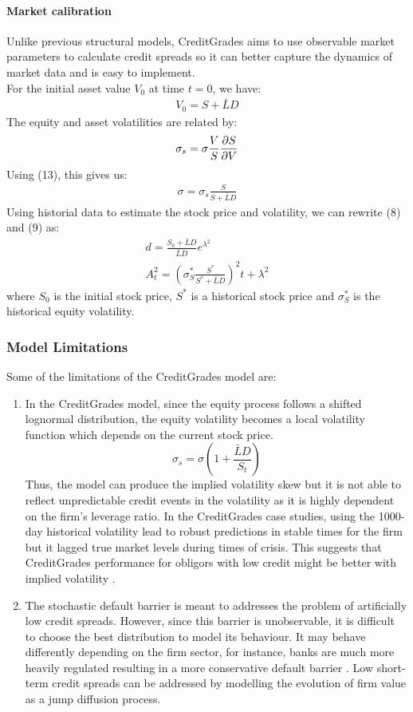\documentclass[11t,a4paper]{article}
\begin{document}
\paragraph {Market calibration}
Unlike previous structural models, CreditGrades aims to use observable market parameters to calculate credit spreads so it can better capture the dynamics of market data and is easy to implement.\\
For the initial asset value $V_0$ at time $t=0$, we have:
\begin{align}
    V_0 = S + \bar{L}D
\end{align}
The equity and asset volatilities are related by:
\begin{align}
    \sigma_s = \sigma \frac{V}{S}\pdv{S}{V}
\end{align}
Using (13), this gives us:
\begin{align}
    \sigma = \sigma_s \frac{S}{S + \bar{L}D}
\end{align}
Using historial data to estimate the stock price and volatility, we can rewrite (8) and (9) as:
\begin{gather}
d = \frac{S_0 + \bar{L}D}{\bar{L}D} e^{\lambda^2}\\
A^2_t = (\sigma_S^*\frac{S^*}{S^*+\bar{L}D})^2t + \lambda^2
\end{gather}
where $S_0$ is the initial stock price, $S^*$ is a historical stock price and $\sigma_S^*$ is the historical equity volatility. 
\subsubsection{Model Limitations}
Some of the limitations of the CreditGrades model are:
\begin{enumerate}
    \item In the CreditGrades model, since the equity process follows a shifted lognormal distribution, the equity volatility becomes a local volatility function which depends on the current stock price. 
    \[\sigma_s = \sigma (1+\frac{\bar{L}{D}}{S_t})\]
    Thus, the model can produce the implied volatility skew but it is not able to reflect unpredictable credit events in the volatility as it is highly dependent on the firm's leverage ratio. In the CreditGrades case studies, using the 1000-day historical volatility lead to robust predictions in stable times for the firm but it lagged true market levels during times of crisis. This suggests that CreditGrades performance for obligors with low credit might be better with implied volatility \cite{cgvol}. 
    \item The stochastic default barrier is meant to addresses the problem of artificially low credit spreads. However, since this barrier is unobservable, it is difficult to choose the best distribution to model its behaviour. It may behave differently depending on the firm sector, for instance, banks are much more heavily regulated resulting in a more conservative default barrier \cite{levycg}. Low short-term credit spreads can be addressed by modelling the evolution of firm value as a jump diffusion process. 
\end{enumerate}
\end{document}
